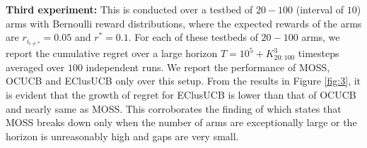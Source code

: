 \textbf{Third experiment:} This is conducted over a testbed of $20-100$ (interval of $10$) arms with Bernoulli reward distributions, where the expected rewards of the arms are $r_{i_{{i}\neq {*}}}=0.05$ and $r^{*}=0.1$. For each of these testbeds of $20-100$ arms, we report the cumulative regret over a large horizon $T=10^{5} + K_{20:100}^{3}$ timesteps averaged over $100$ independent runs. We report the performance of MOSS, OCUCB and EClusUCB only over this setup. From the results in Figure \ref{fig:3}, it is evident that the growth of regret for EClusUCB is lower than that of OCUCB and nearly same as MOSS. This corroborates the finding of \citet{lattimore2015optimally} which states that MOSS breaks down only when the number of arms are exceptionally large or the horizon is unreasonably high and gaps are very small.

